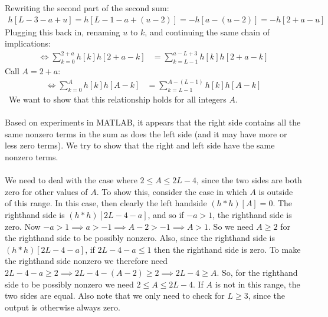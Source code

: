 \documentclass[a4paper]{article}
\begin{document}
Rewriting the second part of the second sum:
\begin{align*}
h[L-3-a+u] = h[L-1-a+(u-2)] = -h[a-(u-2)] = -h[2+a-u]
\end{align*}
Plugging this back in, renaming $u$ to $k$, and continuing the same chain of implications:
\begin{align*}
\iff \sum_{k=0}^{2+a}h[k]h[2+a-k] &= \sum_{k=L-1}^{a-L+3}h[k]h[2+a-k]
\end{align*}
Call $A = 2+a$:
\begin{align*}
\iff \sum_{k=0}^{A}h[k]h[A-k] &= \sum_{k=L-1}^{A-(L-1)}h[k]h[A-k]
\end{align*}\
We want to show that this relationship holds for all integers $A$.
\\\\
Based on experiments in MATLAB, it appears that the right side contains all the same nonzero terms in the sum as does the left side (and it may have more or less zero terms). We try to show that the right and left side have the same nonzero terms.
\\\\
We need to deal with the case where $2 \leq A \leq 2L -4$, since the two sides are both zero for other values of $A$. To show this, consider the case in which $A$ is outside of this range. In this case, then clearly the left handside $(h*h)[A] = 0$. The righthand side is $(h*h)[2L-4-a]$, and so if $-a > 1$, the righthand side is zero. Now $-a>1 \implies a > -1 \implies A -2 > -1 \implies A > 1$. So we need $A  \geq 2$ for the righthand side to be possibly nonzero. Also, since the righthand side is $(h*h)[2L-4-a]$, if $2L-4-a \leq 1$ then the righthand side is zero. To make the righthand side nonzero we therefore need $2L-4-a \geq 2 \implies 2L-4-(A-2) \geq 2 \implies 2L -4 \geq A$. So, for the righthand side to be possibly nonzero we need $2 \leq A \leq 2L-4$. If $A$ is not in this range, the two sides are equal. Also note that we only need to check for $L \geq 3$, since the output is otherwise always zero.
\end{document}
